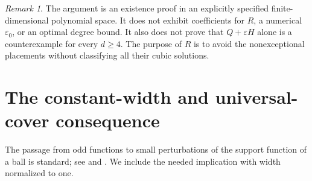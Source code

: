 \documentclass[11pt,reqno]{amsart}
\theoremstyle{definition}
\theoremstyle{remark}
\newtheorem{remark}[remark]{Remark}
\numberwithin{equation}{section}
\newcommand{\eps}{\varepsilon}
\begin{document}
\begin{remark}\label{rem:scope}
The argument is an existence proof in an explicitly specified
finite-dimensional polynomial space. It does not exhibit coefficients
for $R$, a numerical $\eps_0$, or an optimal degree bound. It also
does not prove that $Q+\eps H$ alone is a counterexample for every
$d\geq4$. The purpose of $R$ is to avoid the nonexceptional
placements without classifying all their cubic solutions.
\end{remark}

\section{The constant-width and universal-cover consequence}
\label{sec:geometry}

The passage from odd functions to small perturbations of the support
function of a ball is standard; see
\cite[Section 1, Proposition 1]{Kuperberg1999} and
\cite[Lemma 8]{Chen2026}. We include the needed implication with
width normalized to one.
\end{document}
